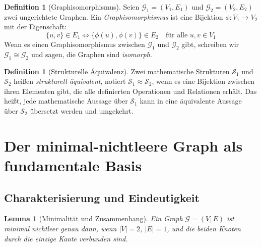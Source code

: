 \documentclass[12pt, a4paper]{article}
\newtheorem{lemma}[theorem]{Lemma}
\theoremstyle{definition}
\newtheorem{definition}[theorem]{Definition}
\theoremstyle{remark}
\newcommand{\Graph}{\mathcal{G}}
\begin{document}
\begin{definition}[Graphisomorphismus]
\label{def:graphisomorphismus}
Seien $\Graph_1 = (V_1, E_1)$ und $\Graph_2 = (V_2, E_2)$ zwei ungerichtete Graphen. Ein \emph{Graphisomorphismus} ist eine Bijektion $\phi: V_1 \to V_2$ mit der Eigenschaft:
\[
  \{u, v\} \in E_1 \iff \{\phi(u), \phi(v)\} \in E_2
  \quad \text{für alle } u, v \in V_1
\]
Wenn es einen Graphisomorphismus zwischen $\Graph_1$ und $\Graph_2$ gibt, schreiben wir $\Graph_1 \cong \Graph_2$ und sagen, die Graphen sind \emph{isomorph}.
\end{definition}

\begin{definition}[Strukturelle Äquivalenz]
\label{def:struktur_aequivalenz}
Zwei mathematische Strukturen $\mathcal{S}_1$ und $\mathcal{S}_2$ heißen \emph{strukturell äquivalent}, notiert $\mathcal{S}_1 \approx \mathcal{S}_2$, wenn es eine Bijektion zwischen ihren Elementen gibt, die alle definierten Operationen und Relationen erhält. Das heißt, jede mathematische Aussage über $\mathcal{S}_1$ kann in eine äquivalente Aussage über $\mathcal{S}_2$ übersetzt werden und umgekehrt.
\end{definition}

\section{Der minimal-nichtleere Graph als fundamentale Basis}
\label{sec:minimalegraph}

\subsection{Charakterisierung und Eindeutigkeit}
\label{subsec:minimal_charakterisierung}

\begin{lemma}[Minimalität und Zusammenhang]
\label{lem:minimal_zusammenhang}
Ein Graph $\Graph = (V, E)$ ist minimal nichtleer genau dann, wenn $|V| = 2$, $|E| = 1$, und die beiden Knoten durch die einzige Kante verbunden sind.
\end{lemma}
\end{document}
